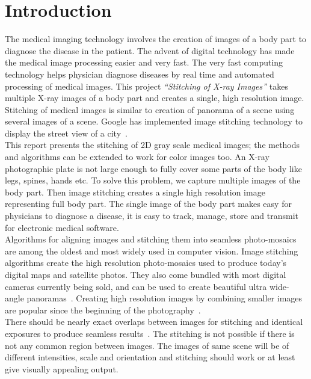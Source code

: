 \chapter{Introduction}
\label{chapter:introduction}
The medical imaging technology involves the creation of images of a body part to diagnose the disease in the patient. The advent of digital technology has made the medical image processing easier and very fast. The very fast computing technology helps physician diagnose diseases by real time and automated processing of medical images. This project \emph{``Stitching of X-ray Images''} takes multiple X-ray images of a body part and creates a single, high resolution image. Stitching of medical images is similar to creation of panorama of a scene using several images of a scene. Google has implemented image stitching technology to display the street view of a city~\cite{wiki:google-street-view}.\\

\noindent This report presents the stitching of 2D gray scale medical images; the methods and algorithms can be extended to work for color images too. An X-ray photographic plate is not large enough to fully cover some parts of the body like legs, spines, hands etc. To solve this problem, we capture multiple images of the body part. Then image stitching creates a single high resolution image representing full body part. The single image of the body part makes easy for physicians to diagnose a disease, it is easy to track, manage, store and transmit for electronic medical software.\\

\noindent Algorithms for aligning images and stitching them into seamless photo-mosaics are among the oldest and most widely used in computer vision. Image stitching algorithms create the high resolution photo-mosaics used to produce today's digital maps and satellite photos. They also come bundled with most digital cameras currently being sold, and can be used to create beautiful ultra wide-angle panoramas~\cite{Szeliski:06}. Creating high resolution images by combining smaller images are popular since the beginning of the photography~\cite{Kumar:10}.\\

\noindent There should be nearly exact overlaps between images for stitching and identical exposures to produce seamless results~\cite{Ward06:3}. The stitching is not possible if there is not any common region between images. The images of same scene will be of different intensities, scale and orientation and stitching should work or at least give visually appealing output. \\

